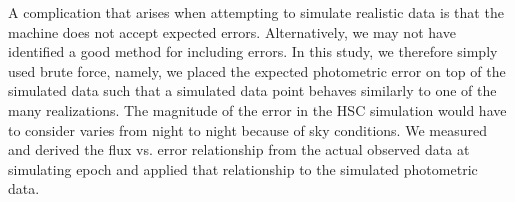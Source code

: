 \documentclass[useamsfonts]{pasj01}
\begin{document}
A complication that arises when attempting to simulate realistic data is that the machine does not accept expected errors. Alternatively, we may not have identified a good method for including errors.   
In this study, we therefore simply used brute force, namely, we placed the expected photometric error on top of the simulated data such that a simulated data point behaves similarly to one of the many realizations.
The magnitude of the error in the HSC simulation would have to consider varies from night to night because of sky conditions. 
We measured and derived the flux vs. error relationship from the actual observed data at simulating epoch and applied that relationship to the simulated photometric data.
\end{document}
